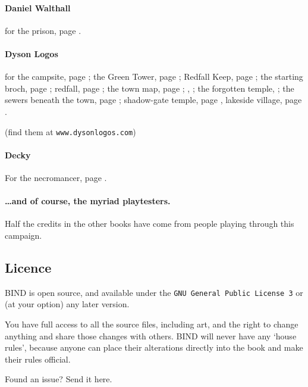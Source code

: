 \begin{multicols}{2}
\paragraph{Daniel Walthall}
for the prison, page \pageref{Daniel_Walthall/prison}.

\paragraph{Dyson Logos}

for the
campsite, page \pageref{Dyson_Logos/forgotten_city};
the Green Tower, page \pageref{Dyson_Logos/green_tower};
Redfall Keep, page \pageref{Dyson_Logos/redfall_keep};
the starting \gls{broch}, page \pageref{Dyson_Logos/broch_map};
\gls{redfall}, page \pageref{Dyson_Logos/redfall};
the town map, page \pageref{Dyson_Logos/town};
, \pageref{Dyson_Logos/mincing_pig};
the forgotten temple, \pageref{Dyson_Logos/qualme_temple};
the sewers beneath the town, page \pageref{Dyson_Logos/sewer};
shadow-gate temple, page \pageref{Dyson_Logos/shadow_gate},
lakeside village, page \pageref{Dyson_Logos/lakeside}.

(find them at {\tt www.dysonlogos.com})

\paragraph{Decky}

For the necromancer, page \pageref{Decky/necromancer}.

\paragraph{\ldots and of course, the myriad playtesters.}
Half the credits in the other books have come from people playing through this campaign.

\subsection*{Licence}

BIND is open source, and available under the {\tt GNU General Public License 3} or (at your option) any later version.

You have full access to all the source files, including art, and the right to change anything and share those changes with others.
BIND will never have any `house rules', because anyone can place their alterations directly into the book and make their rules official.

\begin{center}
  
  Found an issue?
  Send it here.
\end{center}

\end{multicols}

\pagebreak

